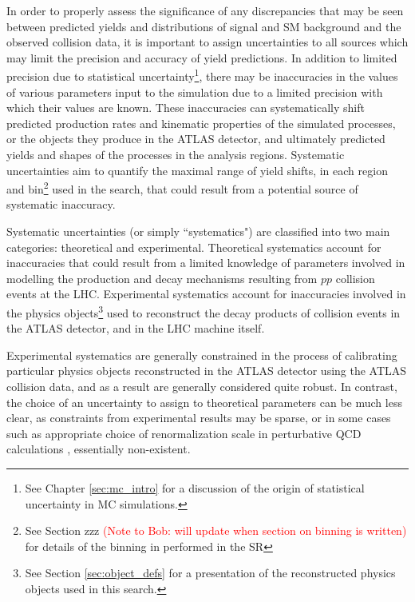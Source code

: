 \label{chapter:systematics}

In order to properly assess the significance of any discrepancies that may be seen between predicted yields and distributions of signal and SM background and the observed collision data, it is important to assign uncertainties to all sources which may limit the precision and accuracy of yield predictions. In addition to limited precision  due to statistical uncertainty\footnote{See Chapter \ref{sec:mc_intro} for a discussion of the origin of statistical uncertainty in MC simulations.}, there may be inaccuracies in the values of various parameters input to the simulation due to a limited precision with which their values are known. These inaccuracies can systematically shift predicted production rates and kinematic properties of the simulated processes, or the objects they produce in the ATLAS detector, and ultimately predicted yields and shapes of the processes in the analysis regions. Systematic uncertainties aim to quantify the maximal range of yield shifts, in each region and bin\footnote{See Section zzz \textcolor{red}{(Note to Bob: will update when section on binning is written)} for details of the binning in \minms performed in the SR} used in the search, that could result from a potential source of systematic inaccuracy. 

Systematic uncertainties (or simply ``systematics") are classified into two main categories: theoretical and experimental. Theoretical systematics account for inaccuracies that could result from a limited knowledge of parameters involved in modelling the production and decay mechanisms resulting from \(pp\) collision events at the LHC. Experimental systematics account for inaccuracies involved in the physics objects\footnote{See Section \ref{sec:object_defs} for a presentation of the reconstructed physics objects used in this search.} used to reconstruct the decay products of collision events in the ATLAS detector, and in the LHC machine itself. 

Experimental systematics are generally constrained in the process of calibrating particular physics objects reconstructed in the ATLAS detector using the ATLAS collision data, and as a result are generally considered quite robust. In contrast, the choice of an uncertainty to assign to theoretical parameters can be much less clear, as constraints from experimental results may be sparse, or in some cases such as appropriate choice of renormalization scale in perturbative QCD calculations \cite{PDG_2018}, essentially non-existent. 

